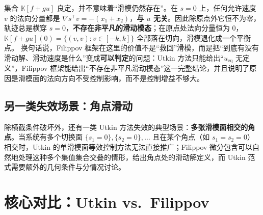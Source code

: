 \begin{remark}[这个反例真正说明了什么]
  集合 $\mathbb{K}[f+gu]$ 良定，并不意味着“滑模仍然存在”。在 $s=0$ 上，任何允许速度 $v$ 的法向分量都是 $\nabla s^\top v=-(x_1+x_2)$，\textbf{与 $u$ 无关}。因此除原点外它恒不为零，轨迹总是横穿 $s=0$，\textbf{不存在非平凡的滑动模态}；在原点处法向分量恒为 $0$，$\mathbb{K}[f+gu](0)=\{(v,v):v\in[-k,k]\}$ 全部落在切向，滑模退化成一个平衡点。
  换句话说，Filippov 框架在这里的价值不是“救回”滑模，而是把“到底有没有滑动解、滑动速度是什么”变成\textbf{可以判定}的问题：Utkin 方法只能给出“$u_\mathrm{eq}$ 无定义”，Filippov 框架能给出“不存在非平凡滑动模态”这一完整结论，并且说明了原因是滑模面的法向方向不受控制影响，而不是控制增益不够大。
\end{remark}

\subsection{另一类失效场景：角点滑动}

除横截条件破坏外，还有一类 Utkin 方法失效的典型场景：\textbf{多张滑模面相交的角点}。当系统有多个切换面 $\{s_1=0\},\{s_2=0\},\dots$ 且在某个角点（如 $s_1=s_2=0$）相交时，Utkin 的单滑模面等效控制方法无法直接推广；Filippov 微分包含可以自然地处理这种多个集值集合交叠的情形，给出角点处的滑动解定义，而 Utkin 范式需要额外的几何条件与分情况讨论。

\section{核心对比：Utkin vs.\ Filippov}\label{sec:comparison}

